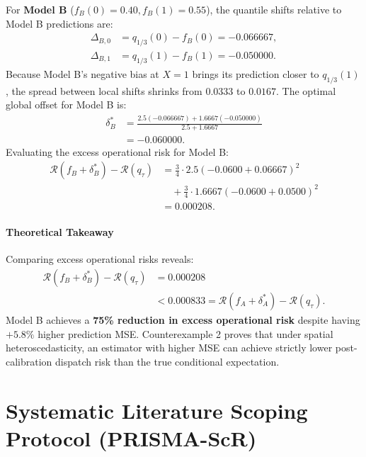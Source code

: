 For \textbf{Model B} ($f_B(0)=0.40, f_B(1)=0.55$), the quantile shifts relative to Model B predictions are:
\begin{align}
\Delta_{B, 0} &= q_{1/3}(0) - f_B(0) = -0.066667, \\
\Delta_{B, 1} &= q_{1/3}(1) - f_B(1) = -0.050000.
\end{align}
Because Model B's negative bias at $X=1$ brings its prediction closer to $q_{1/3}(1)$, the spread between local shifts shrinks from $0.0333$ to $0.0167$. The optimal global offset for Model B is:
\begin{equation}
\begin{aligned}
\delta_B^* &= \frac{2.5 (-0.066667) + 1.6667 (-0.050000)}{2.5 + 1.6667} \\
&= -0.060000.
\end{aligned}
\end{equation}
Evaluating the excess operational risk for Model B:
\begin{equation}
\begin{aligned}
\mathcal{R}(f_B + \delta_B^*) - \mathcal{R}(q_\tau) &= \frac{3}{4} \cdot 2.5 (-0.0600 + 0.06667)^2 \\
&\quad + \frac{3}{4} \cdot 1.6667 (-0.0600 + 0.0500)^2 \\
&= 0.000208.
\end{aligned}
\end{equation}

\paragraph{Theoretical Takeaway}
Comparing excess operational risks reveals:
\begin{equation}
\begin{aligned}
\mathcal{R}(f_B + \delta_B^*) - \mathcal{R}(q_\tau) &= 0.000208 \\
&< 0.000833 = \mathcal{R}(f_A + \delta_A^*) - \mathcal{R}(q_\tau).
\end{aligned}
\end{equation}
Model B achieves a \textbf{75\% reduction in excess operational risk} despite having $+5.8\%$ higher prediction MSE. Counterexample 2 proves that under spatial heteroscedasticity, an estimator with higher MSE can achieve strictly lower post-calibration dispatch risk than the true conditional expectation.

\section{Systematic Literature Scoping Protocol (PRISMA-ScR)}
\label{sec:appendix_audit_protocol}

